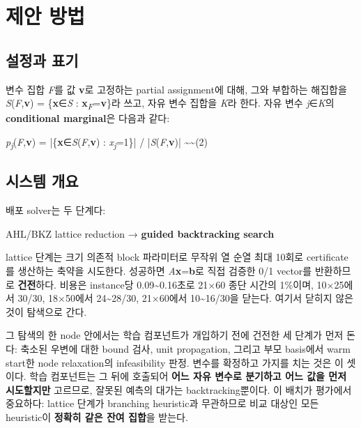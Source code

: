 \documentclass[final,5p,twocolumn]{elsarticle}
\begin{document}
\section{제안 방법}
\subsection{설정과 표기}
변수 집합 \textit{F}를 값 \textbf{v}로 고정하는 partial assignment에 대해, 그와 부합하는 해집합을 \textit{S}(\textit{F},\textbf{v}) = \{\textbf{x}∈\textit{S} : \textbf{x}\textsubscript{\textit{F}}=\textbf{v}\}라 쓰고, 자유 변수 집합을 \textit{K}라 한다. 자유 변수 \textit{j}∈\textit{K}의 \textbf{conditional marginal}은 다음과 같다:

\begin{center}\small \textit{p\textsubscript{j}}(\textit{F},\textbf{v}) = |\{\textbf{x}∈\textit{S}(\textit{F},\textbf{v}) : \textit{x\textsubscript{j}}=1\}| / |\textit{S}(\textit{F},\textbf{v})|  \textasciitilde{}\textasciitilde{}(2)\end{center}
\subsection{시스템 개요}
배포 solver는 두 단계다:

\begin{center}\small AHL/BKZ lattice reduction → \textbf{guided backtracking search}\end{center}
lattice 단계는 크기 의존적 block 파라미터로 무작위 열 순열 최대 10회로 certificate를 생산하는 축약을 시도한다. 성공하면 \textit{A}\textbf{x}=\textbf{b}로 직접 검증한 0/1 vector를 반환하므로 \textbf{건전}하다. 비용은 instance당 0.09\textasciitilde{}0.16초로 21×60 종단 시간의 1\%이며, 10×25에서 30/30, 18×50에서 24\textasciitilde{}28/30, 21×60에서 10\textasciitilde{}16/30을 닫는다. 여기서 닫히지 않은 것이 탐색으로 간다.

그 탐색의 한 node 안에서는 학습 컴포넌트가 개입하기 전에 건전한 세 단계가 먼저 돈다: 축소된 우변에 대한 bound 검사, unit propagation, 그리고 부모 basis에서 warm start한 node relaxation의 infeasibility 판정. 변수를 확정하고 가지를 치는 것은 이 셋이다. 학습 컴포넌트는 그 뒤에 호출되어 \textbf{어느 자유 변수로 분기하고 어느 값을 먼저 시도할지만} 고르므로, 잘못된 예측의 대가는 backtracking뿐이다. 이 배치가 평가에서 중요하다: lattice 단계가 branching heuristic과 무관하므로 비교 대상인 모든 heuristic이 \textbf{정확히 같은 잔여 집합}을 받는다.
\end{document}
